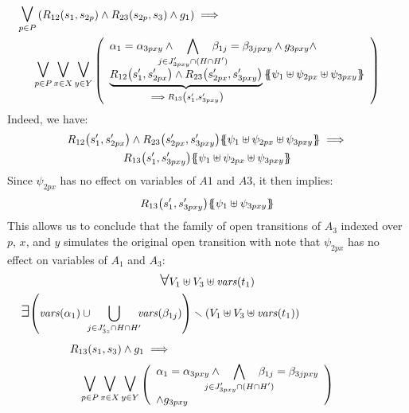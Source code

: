 \documentclass[runningheads]{llncs}
\begin{document}
\begin{enumerate}
\begin{multline*}
\operatorname*{\bigsymb{\bigvee}}_{p\in P} \mpar{R_{12}\mpar{s_1, s_{2p}} \wedge R_{23}\mpar{s_{2p},s_3} \wedge g_1} \implies 
\hspace{5.5cm}\\
\operatorname*{\bigsymb{\bigvee}}_{p\in P}
\operatorname*{\bigsymb{\bigvee}}_{x \in X} 
\operatorname*{\bigsymb{\bigvee}}_{y \in Y}
\mpar{\everymath{\displaystyle}
\begin{array}{l}
\alpha_1=\alpha_{3pxy}\wedge \bigwedge_\subbox{j \in J'_{3pxy} \cap (H\cap H')} \beta_{1j}=\beta_{3jpxy} \wedge g_{3pxy}\wedge \\
\underbrace{R_{12}\mpar{s'_1, s'_{2px}} \wedge R_{23}\mpar{s'_{2px}, s'_{3pxy}}}_{\implies R_{13}\mpar{s'_1,s'_{3pxy}}}\psubst{\psi_1 \uplus \psi_{2px} \uplus \psi_{3pxy}}
\end{array}}
\end{multline*}
Indeed, we have:
\begin{multline*}
R_{12}\mpar{s'_1, s'_{2px}} \wedge R_{23}\mpar{s'_{2px}, s'_{3pxy}}\psubst{\psi_1 \uplus \psi_{2px} \uplus \psi_{3pxy}} \implies\\ R_{13}\mpar{s'_1,s'_{3pxy}}
\psubst{\psi_1 \uplus \psi_{2px} \uplus \psi_{3pxy}}
\end{multline*}
Since $\psi_{2px}$ has no effect on variables of $A1$ and $A3$, it then implies:
\begin{align*}
R_{13}{\left(s'_1,s'_{3pxy}\right)}{\left\{\!\!{\left\{\psi_1  \uplus \psi_{3pxy}\right\}}\!\!\right\}}
\end{align*}
This allows us to conclude that the family of open transitions of $A_3$ indexed over $p$, $x$,  and $y$ simulates the original open transition  with note that $\psi_{2px}$ has no effect on variables of $A_1$ and $A_3$:
\begin{multline*}
\everymath{\displaystyle}
\bigforall V_1 \uplus  V_3 \uplus \fvars{t_1}\\
\bigexists \mpar{\fvars{\alpha_{1}}  \cup\!\!\! \bigcup_{j \in J'_{3z} \cap H \cap H'} \!\!\!\fvars{\beta_{1j} } } \setminus  \mpar{V_1 \uplus  V_3 \uplus \fvars{t_1}}\hspace{3cm}\\
R_{13}(s_1,s_3)  \wedge g_1 \implies 
\hspace{5.5cm}\\
\operatorname*{\bigsymb{\bigvee}}_{p\in P}
\operatorname*{\bigsymb{\bigvee}}_{x \in X} 
\operatorname*{\bigsymb{\bigvee}}_{y \in Y}
\mpar{\everymath{\displaystyle}
\begin{array}{l}
\alpha_1=\alpha_{3pxy}\wedge \bigwedge_\subbox{j \in J'_{3pxy} \cap (H\cap H')} \beta_{1j}=\beta_{3jpxy} \\ \wedge g_{3pxy} 

\end{array}}
\end{multline*}
\end{enumerate}
\end{document}
